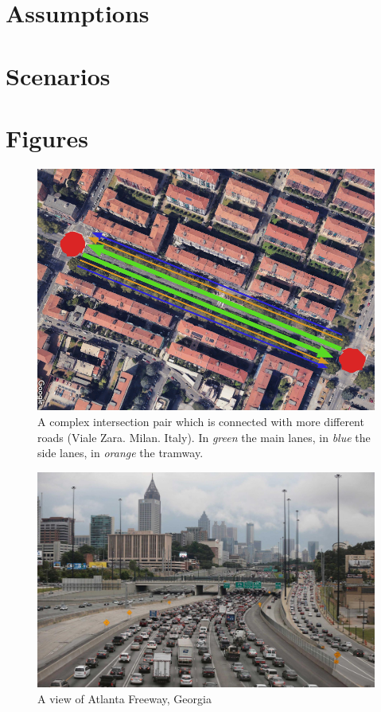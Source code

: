 
\section{Assumptions}


\section{Scenarios}


\section{Figures}

\begin{figure}[h]
    \centering
    \includegraphics[width=0.75\linewidth]{figures/multigraph-is-better-than-nothing.png}
    \caption{A complex intersection pair which is connected with more different roads (Viale Zara. Milan. Italy). In \textit{green} the main lanes, in \textit{blue} the side lanes, in \textit{orange} the tramway.}
    \label{fig:multigraph-is-better-than-nothing}
\end{figure}

\begin{figure}[h]
    \centering
    \includegraphics[width=0.75\linewidth]{figures/atlanta-georgia-freeway.jpg}
    \caption{A view of Atlanta Freeway, Georgia}
    \label{fig:atlanta-georgia-freeway}
\end{figure}

